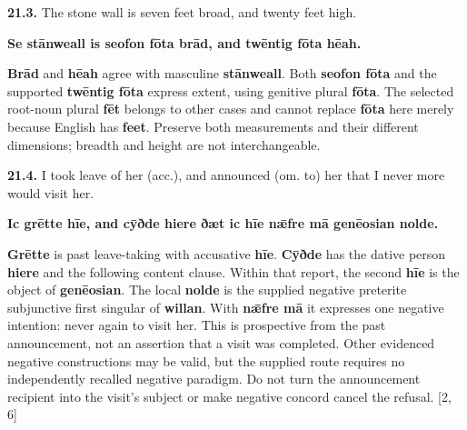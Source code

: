 \par\begin{minipage}{\linewidth}\raggedright
\textbf{21.3.} The stone wall is seven feet broad, and twenty feet high.

\textbf{Se stānweall is seofon fōta brād, and twēntig fōta hēah.}

\textbf{Brād} and \textbf{hēah} agree with masculine \textbf{stānweall}. Both \textbf{seofon fōta} and the supported \textbf{twēntig fōta} express extent, using genitive plural \textbf{fōta}. The selected root-noun plural \textbf{fēt} belongs to other cases and cannot replace \textbf{fōta} here merely because English has \textbf{feet}. Preserve both measurements and their different dimensions; breadth and height are not interchangeable.

\end{minipage}\par\addvspace{4pt}

\par\begin{minipage}{\linewidth}\raggedright
\textbf{21.4.} I took leave of her (acc.), and announced (om. to) her that I never more would visit her.

\textbf{Ic grētte hīe, and cȳðde hiere ðæt ic hīe nǣfre mā genēosian nolde.}

\textbf{Grētte} is past leave-taking with accusative \textbf{hīe}. \textbf{Cȳðde} has the dative person \textbf{hiere} and the following content clause. Within that report, the second \textbf{hīe} is the object of \textbf{genēosian}. The local \textbf{nolde} is the supplied negative preterite subjunctive first singular of \textbf{willan}. With \textbf{nǣfre mā} it expresses one negative intention: never again to visit her. This is prospective from the past announcement, not an assertion that a visit was completed. Other evidenced negative constructions may be valid, but the supplied route requires no independently recalled negative paradigm. Do not turn the announcement recipient into the visit's subject or make negative concord cancel the refusal. [2, 6]

\end{minipage}\par\addvspace{4pt}

